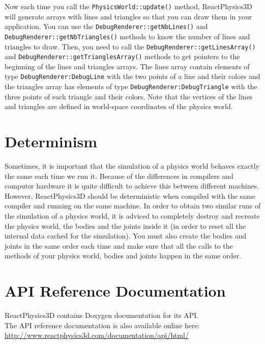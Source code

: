 \documentclass[a4paper,12pt]{article}
\begin{document}
  \begin{sloppypar}
    Now each time you call the \texttt{PhysicsWorld::update()} method, ReactPhysics3D will generate arrays with lines and triangles so that you can
    draw them in your application. You can use the \texttt{DebugRenderer::getNbLines()} and \texttt{DebugRenderer::getNbTriangles()} methods to know
    the number of lines and triangles to draw. Then, you need to call the \texttt{DebugRenderer::getLinesArray()} and
    \texttt{DebugRenderer::getTrianglesArray()} methods to get pointers to the beginning of the lines and triangles arrays. The lines array contain
    elements of type \texttt{DebugRenderer:DebugLine} with the two points of a line and their colors and the triangles array has elements of
    type \texttt{DebugRenderer:DebugTriangle} with the three points of each triangle and their colors. Note that the vertices of the lines and triangles
    are defined in world-space coordinates of the physics world.
  \end{sloppypar}

    \section{Determinism}
    \label{sec:determinism}

    Sometimes, it is important that the simulation of a physics world behaves exactly the same each time we run it. Because of the differences in
    compilers and computer hardware it is quite difficult to achieve this between different machines. However, ReactPhysics3D should be deterministic when
    compiled with the same compiler and running on the same machine. In order to obtain two similar runs of the simulation of a physics world, it is
    adviced to completely destroy and recreate the physics world, the bodies and the joints inside it (in order to reset all the internal data cached
    for the simulation). You must also create the bodies and joints in the same order each time and make sure that all the calls to the methods
    of your physics world, bodies and joints happen in the same order.

   \section{API Reference Documentation}

   ReactPhysics3D contains Doxygen documentation for its API. \\

   The API reference documentation is also available online here: \url{http://www.reactphysics3d.com/documentation/api/html/} \\
\end{document}
